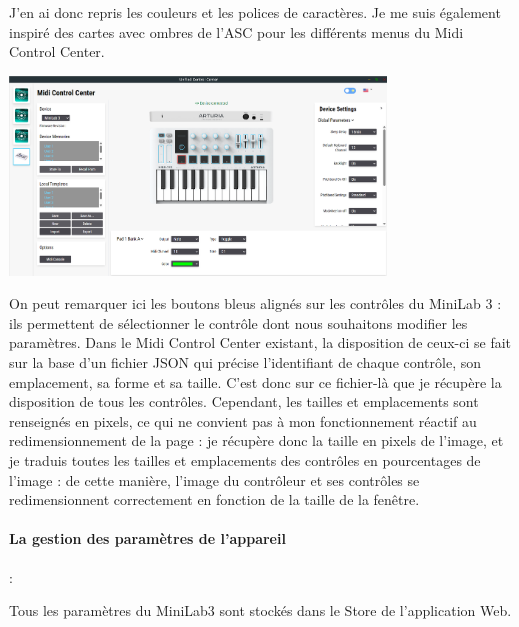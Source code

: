 \documentclass[francais]{rapportPFE}  %
\begin{document}
J'en ai donc repris les couleurs et les polices de caractères. Je me suis également inspiré des cartes avec ombres de l'ASC pour les différents menus du Midi Control Center.

\begin{center}
    \centering
    \includegraphics[width=10cm]{graphics/mcc_new.png}
    \label{fig:test1}
\end{center}

On peut remarquer ici les boutons bleus alignés sur les contrôles du MiniLab 3 : ils permettent de sélectionner le contrôle dont nous souhaitons modifier les paramètres. Dans le Midi Control Center existant, la disposition de ceux-ci se fait sur la base d'un fichier JSON qui précise l'identifiant de chaque contrôle, son emplacement, sa forme et sa taille. C'est donc sur ce fichier-là que je récupère la disposition de tous les contrôles. Cependant, les tailles et emplacements sont renseignés en pixels, ce qui ne convient pas à mon fonctionnement réactif au redimensionnement de la page : je récupère donc la taille en pixels de l'image, et je traduis toutes les tailles et emplacements des contrôles en pourcentages de l'image : de cette manière, l'image du contrôleur et ses contrôles se redimensionnent correctement en fonction de la taille de la fenêtre.



\paragraph{La gestion des paramètres de l'appareil}:

Tous les paramètres du MiniLab3 sont stockés dans le Store de l'application Web.
\end{document}
